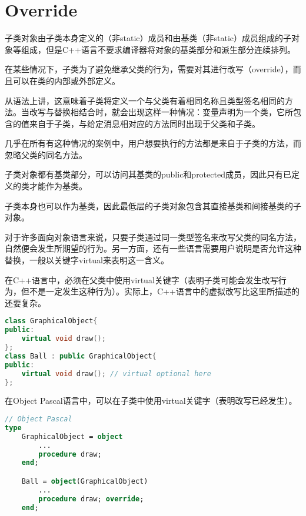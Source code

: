 \section{Override}

子类对象由子类本身定义的（非static）成员和由基类（非static）成员组成的子对象等组成，但是C++语言不要求编译器将对象的基类部分和派生部分连续排列。

在某些情况下，子类为了避免继承父类的行为，需要对其进行改写（override），而且可以在类的内部或外部定义。

从语法上讲，这意味着子类将定义一个与父类有着相同名称且类型签名相同的方法。当改写与替换相结合时，就会出现这样一种情况：变量声明为一个类，它所包含的值来自于子类，与给定消息相对应的方法同时出现于父类和子类。

几乎在所有有这种情况的案例中，用户想要执行的方法都是来自于子类的方法，而忽略父类的同名方法。


\begin{compactitem}
\item 子类对象都有基类部分，可以访问其基类的public和protected成员，因此只有已定义的类才能作为基类。
\item 子类本身也可以作为基类，因此最低层的子类对象包含其直接基类和间接基类的子对象。
\end{compactitem}




对于许多面向对象语言来说，只要子类通过同一类型签名来改写父类的同名方法，自然便会发生所期望的行为。另一方面，还有一些语言需要用户说明是否允许这种替换，一般以关键字virtual来表明这一含义。

在C++语言中，必须在父类中使用virtual关键字（表明子类可能会发生改写行为，但不是一定发生这种行为）。实际上，C++语言中的虚拟改写比这里所描述的还要复杂。

\begin{lstlisting}[language=C++]
class GraphicalObject{
public:
	virtual void draw();
};
class Ball : public GraphicalObject{
public:
	virtual void draw(); // virtual optional here	
};
\end{lstlisting}



在Object Pascal语言中，可以在子类中使用virtual关键字（表明改写已经发生）。


\begin{lstlisting}[language=Pascal]
// Object Pascal
type
	GraphicalObject = object
		...
		procedure draw;
	end;

	Ball = object(GraphicalObject)
		...
		procedure draw; override;
	end;
\end{lstlisting}

